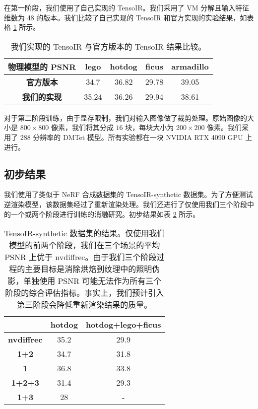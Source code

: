 在第一阶段，我们使用了自己实现的 TensoIR。我们采用了 VM 分解且输入特征维数为 48 的版本。我们比较了自己实现的 TensoIR 和官方实现的实验结果，如表格 \ref{tab:tensoir} 所示。

\begin{table}[h]
  \centering
  \begin{tabular}{c|cccc}
  \textbf{物理模型的 PSNR} & lego  & hotdog & ficus & armadillo \\ \hline
  \textbf{官方版本}   & 34.7  & 36.82  & 29.78 & 39.05     \\
  \textbf{我们的实现} & 35.24 & 36.26  & 29.94 & 38.61
  \end{tabular}
  \caption{我们实现的 TensoIR 与官方版本的 TensoIR 结果比较。}
  \label{tab:tensoir}
\end{table}

对于第二阶段训练，由于显存限制，我们对输入图像做了裁剪处理。原始图像的大小是 $800 \times 800$ 像素，我们将其分成 $16$ 块，每块大小为 $200 \times 200$ 像素。我们采用了 288 分辨率的 DMTet 模型。所有实验都在一块 NVIDIA RTX 4090 GPU 上进行。

\subsection*{初步结果}

我们使用了类似于 NeRF 合成数据集的 TensoIR-synthetic 数据集。为了方便测试逆渲染模型，该数据集经过了重新渲染处理。我们还进行了仅使用我们三个阶段中的一个或两个阶段进行训练的消融研究。初步结果如表 \ref{tab:result} 所示。

\begin{table}[h]
  \centering
  \begin{tabular}{c|c|c}
                     & \textbf{hotdog} & \textbf{hotdog+lego+ficus} \\ \hline
  \textbf{nvdiffrec} & 35.2            & 29.9                       \\ \hline
  \textbf{1+2}       & 34.7            & 31.8                       \\ \hline
  \textbf{1}         & 36.8            & 33.8                       \\ \hline
  \textbf{1+2+3}     & 31.4            & 29.3                       \\ \hline
  \textbf{1+3}       & 28              & -
  \end{tabular}
\caption{TensoIR-synthetic 数据集的结果。仅使用我们模型的前两个阶段，我们在三个场景的平均 PSNR 上优于 nvdiffrec。由于我们三个阶段过程的主要目标是消除烘焙到纹理中的照明伪影，单独使用 PSNR 可能无法作为所有三个阶段的综合评估指标。事实上，我们预计引入第三阶段会降低重新渲染结果的质量。}
\label{tab:result}
\end{table}

